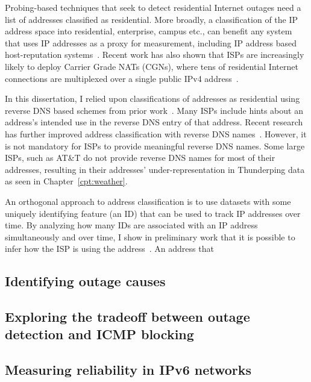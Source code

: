 Probing-based techniques that seek to detect residential Internet
outages need a list of addresses classified as residential. More
broadly, a classification of the IP address space into residential,
enterprise, campus etc., can benefit any system that uses IP addresses
as a proxy for measurement, including IP address based host-reputation
systems~\cite{fail2ban,spamhaus,cbl,sorbs}. Recent work has also shown
that ISPs are increasingly likely to deploy Carrier Grade NATs (CGNs),
where tens of residential Internet connections are multiplexed over a single
public IPv4 address~\cite{cgn-imc16}.

In this dissertation, I relied upon classifications of addresses as
residential using reverse DNS based schemes from prior
work~\cite{pingin}. Many ISPs include hints about an address's
intended use in
the reverse DNS entry of that address. Recent research has further improved address
classification with reverse DNS names~\cite{youndo-rdns}. However,
it is not mandatory for ISPs to provide meaningful reverse DNS
names. Some large ISPs, such as AT\&T do not provide reverse DNS names
for most of their addresses, resulting in their addresses' under-representation in
Thunderping data as seen in Chapter~\ref{cpt:weather}.

An orthogonal approach to address classification is to use datasets with
some uniquely identifying feature (an ID) that can be used to track IP
addresses over time. By analyzing how many IDs are associated with an IP
address simultaneously and over time, I show in preliminary work that it is possible to infer
how the ISP is using the address~\cite{shared-addrs-apnic-blog, shared-addrs-aims}. An address that 



\subsection{Identifying outage causes}



\subsection{Exploring the tradeoff between outage detection and ICMP blocking}



\subsection{Measuring reliability in IPv6 networks}

